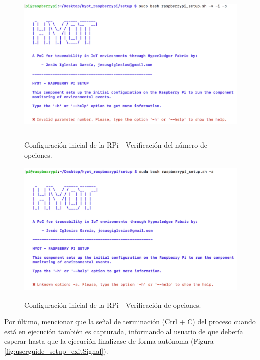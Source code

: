 \documentclass[12pt,a4paper, twoside]{report}
\begin{document}
\begin{enumerate}
\begin{itemize}
			\begin{figure}[!ht]   
				\caption{Configuración inicial de la RPi - Verificación del número de opciones.} 
				\begin{center} 
					\includegraphics[width=15cm,height=7cm]{Images/userGuide/setup/invalidNumber} \\
					\label{fig:userguide_setup_numberoptions} 
				\end{center}  
			\end{figure}
			
			\begin{figure}[!ht]   
				\caption{Configuración inicial de la RPi - Verificación de opciones.} 
				\begin{center} 
					\includegraphics[width=15cm,height=6.5cm]{Images/userGuide/setup/unknownOption} \\
					\label{fig:userguide_setup_validoptions} 
				\end{center}  
			\end{figure}
		
		\end{itemize}
	 \end{enumerate} 
	 
	 Por último, mencionar que la señal de terminación (Ctrl + C) del proceso cuando está en ejecución también es capturada, informando al usuario de que debería esperar hasta que la ejecución finalizase de forma autónoma (Figura \ref{fig:userguide_setup_exitSignal}).
	 
\end{document}
